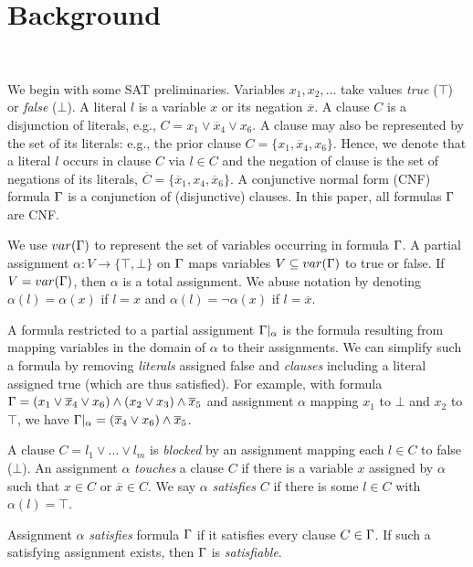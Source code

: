 \section{Background}~\label{sec:background}

We begin with some SAT preliminaries. Variables $x_1, x_2, \dots$ take values
\emph{true} ($\top$) or \emph{false} ($\bot$). A literal $l$ is a variable $x$
or its negation $\overline{x}$. A clause $C$ is a disjunction of literals, e.g.,
$C = x_1 \lor \overline{x}_4 \lor x_6$. A clause may also be represented by the
set of its literals: e.g., the prior clause $C = \{x_1, \overline{x}_4, x_6\}$.
Hence, we denote that a literal $l$ occurs in clause $C$ via $l \in C$ and the
negation of clause is the set of negations of its literals, $\overline{C} =
\{\overline{x}_1, x_4, \overline{x}_6\}$. A conjunctive normal form (CNF)
formula $\Gamma$ is a conjunction of (disjunctive) clauses. In this paper, all
formulas $\Gamma$ are CNF.

We use $var(\Gamma)$ to represent the set of variables occurring in formula
$\Gamma$. A partial assignment $\alpha : V \rightarrow \{\top, \bot\}$ on
$\Gamma$ maps variables $V \subseteq var(\Gamma)$ to true or false. If $V =
var(\Gamma)$, then $\alpha$ is a total assignment. We abuse notation by
denoting $\alpha(l) = \alpha(x)$ if $l = x$ and $\alpha(l) = \neg \alpha(x)$ if
$l = \overline{x}$.

A formula restricted to a partial assignment $\Gamma|_\alpha$ is the formula
resulting from mapping variables in the domain of $\alpha$ to their assignments.
We can simplify such a formula by removing \emph{literals} assigned false and
\emph{clauses} including a literal assigned true (which are thus satisfied). For
example, with formula $\Gamma = (x_1 \lor \overline{x}_4 \lor x_6) \land (x_2
\lor x_3) \land \overline{x}_5$ and assignment $\alpha$ mapping $x_1$ to $\bot$
and $x_2$ to $\top$, we have $\Gamma|_\alpha = (\overline{x}_4 \lor x_6) \land
\overline{x}_5$.

A clause $C = l_1 \lor \dots \lor l_m$ is \emph{blocked} by an assignment
mapping each $l \in C$ to false ($\bot$). An assignment $\alpha$ \emph{touches}
a clause $C$ if there is a variable $x$ assigned by $\alpha$ such that $x \in C$
or $\overline{x} \in C$. We say $\alpha$ \emph{satisfies} $C$ if there is some
$l \in C$ with $\alpha(l) = \top$.

Assignment $\alpha$ \emph{satisfies} formula $\Gamma$ if it satisfies every
clause $C \in \Gamma$. If such a satisfying assignment exists, then $\Gamma$
is \emph{satisfiable}.

